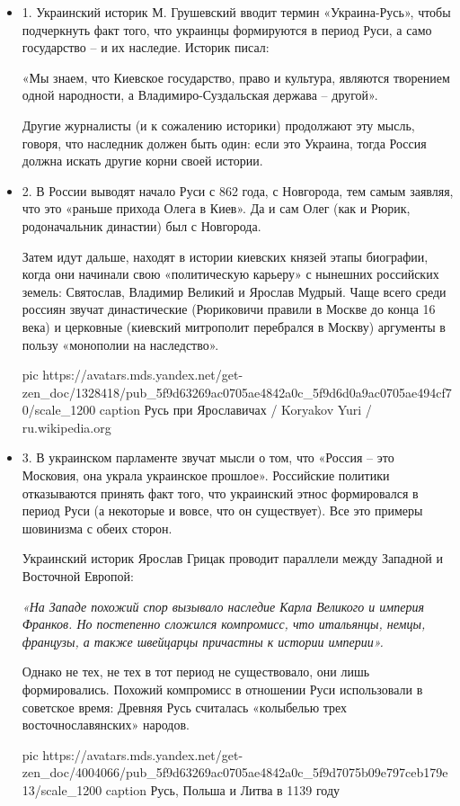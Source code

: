 \begin{itemize}

\item 1. Украинский историк М. Грушевский вводит термин «Украина-Русь», чтобы подчеркнуть факт того, что украинцы формируются в период Руси, а само государство – и их наследие. Историк писал:

		«Мы знаем, что Киевское государство, право и культура, являются творением
		одной народности, а Владимиро-Суздальская держава – другой». 

Другие журналисты (и к сожалению историки) продолжают эту мысль, говоря, что
наследник должен быть один: если это Украина, тогда Россия должна искать другие
корни своей истории.

\item 2. В России выводят начало Руси с 862 года, с Новгорода, тем самым
				заявляя, что это «раньше прихода Олега в Киев». Да и сам Олег (как и
				Рюрик, родоначальник династии) был с Новгорода.

Затем идут дальше, находят в истории киевских князей этапы биографии, когда они
начинали свою «политическую карьеру» с нынешних российских земель: Святослав,
Владимир Великий и Ярослав Мудрый. Чаще всего среди россиян звучат
династические (Рюриковичи правили в Москве до конца 16 века) и церковные
(киевский митрополит перебрался в Москву) аргументы в пользу «монополии на
наследство».

\ifcmt
  pic https://avatars.mds.yandex.net/get-zen_doc/1328418/pub_5f9d63269ac0705ae4842a0c_5f9d6d0a9ac0705ae494cf70/scale_1200
  caption Русь при Ярославичах / Koryakov Yuri / ru.wikipedia.org
\fi

\item 3. В украинском парламенте звучат мысли о том, что «Россия – это
Московия, она украла украинское прошлое». Российские политики
отказываются принять факт того, что украинский этнос
формировался в период Руси (а некоторые и вовсе, что он
существует). Все это примеры шовинизма с обеих сторон.

Украинский историк Ярослав Грицак проводит параллели между Западной и Восточной
Европой: 

\begin{leftbar}
	\begingroup
		\em
			«На Западе похожий спор вызывало наследие Карла Великого и империя
				Франков. Но постепенно сложился компромисс, что итальянцы, немцы,
				французы, а также швейцарцы причастны к истории империи».
	\endgroup
\end{leftbar}

Однако не тех, не тех в тот период не существовало, они лишь формировались.
Похожий компромисс в отношении Руси использовали в советское
время: Древняя Русь считалась «колыбелью трех
восточнославянских» народов.

\ifcmt
  pic https://avatars.mds.yandex.net/get-zen_doc/4004066/pub_5f9d63269ac0705ae4842a0c_5f9d7075b09e797ceb179e13/scale_1200
  caption Русь, Польша и Литва в 1139 году
\fi

\end{itemize}

